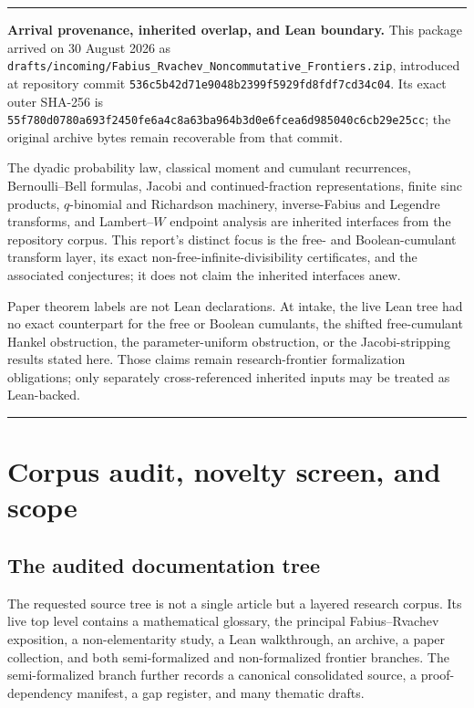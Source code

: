 \documentclass[11pt,oneside]{article}
\theoremstyle{definition}
\theoremstyle{remark}
\newenvironment{boxedremark}{%
  \par\smallskip\noindent\begin{center}\begin{minipage}{0.94\textwidth}%
  \color{black}\hrule\vspace{0.6em}\small
}{%
  \vspace{0.6em}\hrule\end{minipage}\end{center}\smallskip
}
\begin{document}
\begin{boxedremark}
\textbf{Arrival provenance, inherited overlap, and Lean boundary.}
This package arrived on 30 August 2026 as
\nolinkurl{drafts/incoming/Fabius_Rvachev_Noncommutative_Frontiers.zip},
introduced at repository commit
\nolinkurl{536c5b42d71e9048b2399f5929fd8fdf7cd34c04}.  Its exact outer
SHA-256 is
\nolinkurl{55f780d0780a693f2450fe6a4c8a63ba964b3d0e6fcea6d985040c6cb29e25cc};
the original archive bytes remain recoverable from that commit.

The dyadic probability law, classical moment and cumulant recurrences,
Bernoulli--Bell formulas, Jacobi and continued-fraction representations,
finite sinc products, \(q\)-binomial and Richardson machinery,
inverse-Fabius and Legendre transforms, and Lambert--\(W\) endpoint analysis
are inherited interfaces from the repository corpus.  This report's distinct
focus is the free- and Boolean-cumulant transform layer, its exact
non-free-infinite-divisibility certificates, and the associated conjectures;
it does not claim the inherited interfaces anew.

Paper theorem labels are not Lean declarations.  At intake, the live Lean
tree had no exact counterpart for the free or Boolean cumulants, the shifted
free-cumulant Hankel obstruction, the parameter-uniform obstruction, or the
Jacobi-stripping results stated here.  Those claims remain research-frontier
formalization obligations; only separately cross-referenced inherited inputs
may be treated as Lean-backed.
\end{boxedremark}

\tableofcontents
\newpage

\section{Corpus audit, novelty screen, and scope}
\subsection{The audited documentation tree}
The requested source tree is not a single article but a layered research corpus. Its live top level contains a mathematical glossary, the principal Fabius--Rvachev exposition, a non-elementarity study, a Lean walkthrough, an archive, a paper collection, and both semi-formalized and non-formalized frontier branches. The semi-formalized branch further records a canonical consolidated source, a proof-dependency manifest, a gap register, and many thematic drafts.
\end{document}
